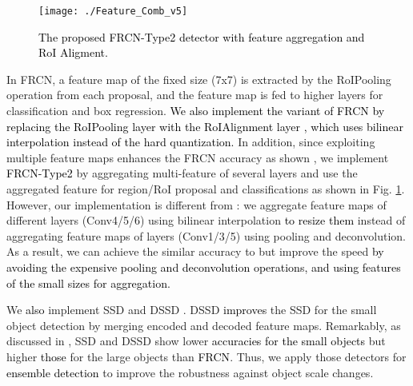 \documentclass[10pt,twocolumn,letterpaper]{article}
\newcommand{\RE}{\textcolor{black}}
\newcommand{\RV}{\textcolor{black}}
\begin{document}
\begin{figure}[!tbp]
\texttt{[image: ./Feature\_Comb\_v5]}
\caption{\RV{The proposed FRCN-Type2 detector with feature aggregation and RoI Aligment.}}
\label{fig:Feature_comb}
\end{figure}


In FRCN, a feature map of the fixed size (\eg 7x7) is extracted by the RoIPooling operation from each proposal, and the feature map is fed to higher layers for classification and box regression. \RE{We also implement the variant of \RE{FRCN} by replacing the RoIPooling layer with the \RV{RoIAlignment} layer \cite{HeGDG_CORR17}, which uses bilinear interpolation instead of the hard quantization.} 
In addition, since exploiting multiple feature maps enhances the FRCN accuracy as shown \cite{KongYCS_CVPR16}, we implement {\RE{FRCN-Type2}} by aggregating multi-feature of several layers and use the aggregated feature for region/RoI proposal and classifications as shown in Fig. \ref{fig:Feature_comb}. However, our implementation is different from \cite{KongYCS_CVPR16}: we aggregate feature maps of different layers (Conv4/5/6) using bilinear interpolation \RV{to resize} \RV{them} instead of aggregating feature maps of layers (Conv1/3/5) using pooling and deconvolution. As a result, we can achieve the similar accuracy to  \cite {KongYCS_CVPR16} but improve the speed \RV{by avoiding the expensive pooling and deconvolution operations, and using features of the small sizes for aggregation.}




We \RV{also} implement SSD \cite{LiuAESRFB_ECCV16} and DSSD \cite{FuLRTB_Corr17}. DSSD \RV{improves} the SSD for the small object detection by merging encoded and decoded feature maps. Remarkably, as discussed in \cite{FuLRTB_Corr17, HuangRSZKFFWSG_Corr16}, SSD and DSSD show lower \RE{accuracies for the small objects} but higher \RE{those} for the large objects than \RE{FRCN}. Thus, we apply those detectors for \RE{ensemble detection} to improve the robustness against object scale changes.
\end{document}
